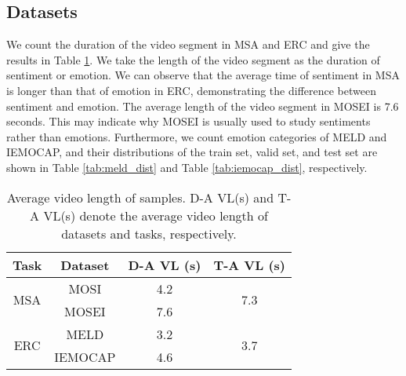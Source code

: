 \documentclass[11pt]{article}
\begin{document}
\subsection{Datasets}
\label{sec:duration}
We count the duration of the video segment in MSA and ERC and give the results in Table \ref{tab:duration}. We take the length of the video segment as the duration of sentiment or emotion. We can observe that the average time of sentiment in MSA is longer than that of emotion in ERC, demonstrating the difference between sentiment and emotion. 
The average length of the video segment in MOSEI is 7.6 seconds. This may indicate why MOSEI is usually used to study sentiments rather than emotions. Furthermore, we count emotion categories of MELD and IEMOCAP, and their distributions of the train set, valid set, and test set are shown in Table \ref{tab:meld_dist} and Table \ref{tab:iemocap_dist}, respectively.
\begin{table}[h]
\begin{tabular}{c|ccc}
\toprule
\textbf{Task}        & \textbf{Dataset} & \textbf{D-A VL (s)} & \textbf{T-A VL (s)} \\
\midrule
\multirow{2}{*}{MSA} & MOSI             & 4.2                                             & \multirow{2}{*}{7.3}                         \\
                     & MOSEI            & 7.6                                             &                                              \\
\midrule
\multirow{2}{*}{ERC} & MELD             & 3.2                                             & \multirow{2}{*}{3.7}                         \\
                     & IEMOCAP          & 4.6                                             &       \\
\bottomrule
\end{tabular}
\caption{Average video length of samples. D-A VL(s) and T-A VL(s) denote the average video length of datasets and tasks, respectively.}
\label{tab:duration}
\end{table}
\begin{table}[h]
\caption{The distribution of emotion category on dataset MELD.}
\label{tab:meld_dist}
\end{table}
\end{document}
